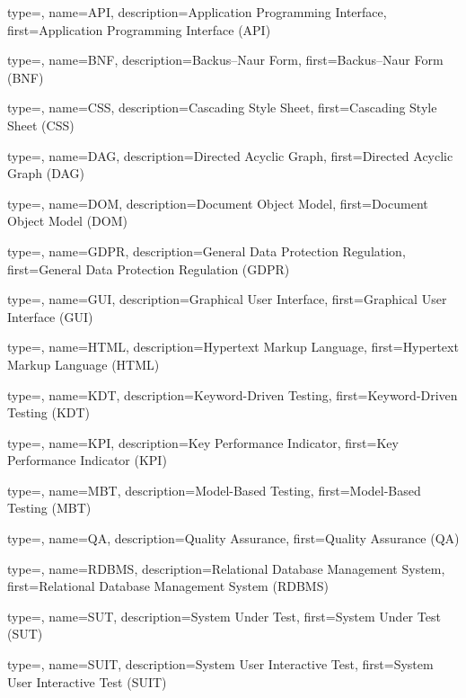 
{
	type=\acronymtype,
	name={API},
	description={Application Programming Interface},
	first={Application Programming Interface (API)}
}

{
	type=\acronymtype,
	name={BNF},
	description={Backus–Naur Form},
	first={Backus–Naur Form (BNF)}
}

{
	type=\acronymtype,
	name={CSS},
	description={Cascading Style Sheet},
	first={Cascading Style Sheet (CSS)}
}

{
	type=\acronymtype,
	name={DAG},
	description={Directed Acyclic Graph},
	first={Directed Acyclic Graph (DAG)}
}

{
	type=\acronymtype,
	name={DOM},
	description={Document Object Model},
	first={Document Object Model (DOM)}
}

{
	type=\acronymtype,
	name={GDPR},
	description={General Data Protection Regulation},
	first={General Data Protection Regulation (GDPR)}
}

{
	type=\acronymtype,
	name={GUI},
	description={Graphical User Interface},
	first={Graphical User Interface (GUI)}
}



{
	type=\acronymtype,
	name={HTML},
	description={Hypertext Markup Language},
	first={Hypertext Markup Language (HTML)}
}

{
	type=\acronymtype,
	name={KDT},
	description={Keyword-Driven Testing},
	first={Keyword-Driven Testing (KDT)}
}

{
	type=\acronymtype,
	name={KPI},
	description={Key Performance Indicator},
	first={Key Performance Indicator (KPI)}
}

{
	type=\acronymtype,
	name={MBT},
	description={Model-Based Testing},
	first={Model-Based Testing (MBT)}
}

{
	type=\acronymtype,
	name={QA},
	description={Quality Assurance},
	first={Quality Assurance (QA)}
}

{
	type=\acronymtype,
	name={RDBMS},
	description={Relational Database Management System},
	first={Relational Database Management System (RDBMS)}
}


{
	type=\acronymtype,
	name={SUT},
	description={System Under Test},
	first={System Under Test (SUT)}
}

{
	type=\acronymtype,
	name={SUIT},
	description={System User Interactive Test},
	first={System User Interactive Test (SUIT)}
}

